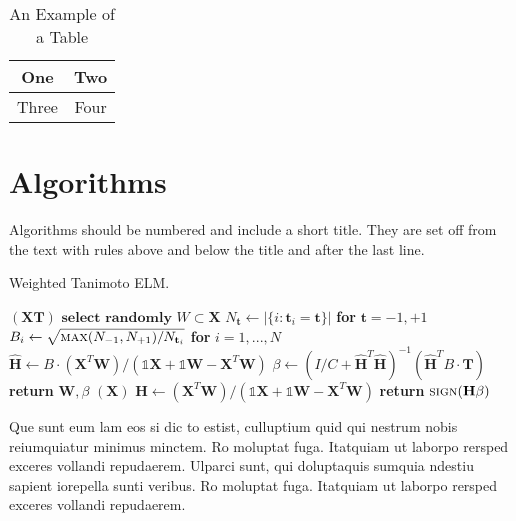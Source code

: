 \documentclass[lettersize,journal]{IEEEtran}
\begin{document}
\begin{table}[!t]
\caption{An Example of a Table\label{tab:table1}}
\centering
\begin{tabular}{|c||c|}
\hline
One & Two\\
\hline
Three & Four\\
\hline
\end{tabular}
\end{table}

\section{Algorithms}
Algorithms should be numbered and include a short title. They are set off from the text with rules above and below the title and after the last line.

\begin{algorithm}[H]
\caption{Weighted Tanimoto ELM.}\label{alg:alg1}
\begin{algorithmic}
\STATE 
{}$(\mathbf{X} \mathbf{T})$
\STATE \hspace{0.5cm}$ \textbf{select randomly } W \subset \mathbf{X}  $
\STATE \hspace{0.5cm}$ N_\mathbf{t} \gets | \{ i : \mathbf{t}_i = \mathbf{t} \} | $ \textbf{ for } $ \mathbf{t}= -1,+1 $
\STATE \hspace{0.5cm}$ B_i \gets \sqrt{ \textsc{max}(N_{-1},N_{+1}) / N_{\mathbf{t}_i} } $ \textbf{ for } $ i = 1,...,N $
\STATE \hspace{0.5cm}$ \hat{\mathbf{H}} \gets  B \cdot (\mathbf{X}^T\textbf{W})/( \mathbb{1}\mathbf{X} + \mathbb{1}\textbf{W} - \mathbf{X}^T\textbf{W} ) $
\STATE \hspace{0.5cm}$ \beta \gets \left ( I/C + \hat{\mathbf{H}}^T\hat{\mathbf{H}} \right )^{-1}(\hat{\mathbf{H}}^T B\cdot \mathbf{T})  $
\STATE \hspace{0.5cm}\textbf{return}  $\textbf{W},  \beta $
\STATE 
{}$(\mathbf{X} )$
\STATE \hspace{0.5cm}$ \mathbf{H} \gets  (\mathbf{X}^T\textbf{W} )/( \mathbb{1}\mathbf{X}  + \mathbb{1}\textbf{W}- \mathbf{X}^T\textbf{W}  ) $
\STATE \hspace{0.5cm}\textbf{return}  $\textsc{sign}( \mathbf{H} \beta )$
\end{algorithmic}
\label{alg1}
\end{algorithm}

Que sunt eum lam eos si dic to estist, culluptium quid qui nestrum nobis reiumquiatur minimus minctem. Ro moluptat fuga. Itatquiam ut laborpo rersped exceres vollandi repudaerem. Ulparci sunt, qui doluptaquis sumquia ndestiu sapient iorepella sunti veribus. Ro moluptat fuga. Itatquiam ut laborpo rersped exceres vollandi repudaerem. 
\end{document}
